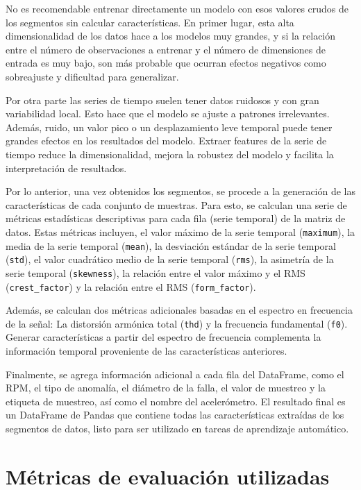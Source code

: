 \documentclass[11pt,a4paper,spanish]{book}
\numberwithin{equation}{chapter}
\numberwithin{figure}{chapter}
\begin{document}
No es recomendable entrenar directamente un modelo con esos valores crudos de los 
segmentos sin calcular características. En primer lugar, esta alta dimensionalidad de 
los datos hace a los modelos muy grandes, y si la relación entre el número de 
observaciones a entrenar y el número de dimensiones de entrada es muy bajo, son más 
probable que ocurran  efectos negativos como sobreajuste y dificultad para generalizar. 


Por otra parte las series de tiempo suelen tener datos ruidosos y con gran variabilidad 
local. Esto hace que el modelo se ajuste a patrones irrelevantes.  Además, ruido, un 
valor pico o un desplazamiento leve temporal puede tener grandes efectos en los 
resultados del modelo. Extraer features de la serie de tiempo reduce la dimensionalidad, 
mejora la robustez del modelo y facilita la interpretación de resultados. 


Por lo anterior, una vez obtenidos los segmentos, se procede a la generación de las 
características de cada conjunto de muestras. Para esto, se calculan una serie de 
métricas estadísticas descriptivas para cada fila (serie temporal) de la matriz de 
datos. Estas métricas incluyen, el valor máximo de la serie temporal (\texttt{maximum}),
la media de la serie temporal (\texttt{mean}), la desviación estándar de la serie
temporal (\texttt{std}), el valor cuadrático medio de la serie temporal (\texttt{rms}),
la asimetría de la serie temporal (\texttt{skewness}), la relación entre el valor máximo 
y el RMS (\texttt{crest\_factor}) y la relación entre el RMS (\texttt{form\_factor}).

Además, se calculan dos métricas adicionales basadas en el espectro en frecuencia de la señal:
La distorsión armónica total (\texttt{thd}) y la frecuencia fundamental (\texttt{f0}).
Generar características a partir del espectro de frecuencia complementa la información
temporal proveniente de las características anteriores. 


Finalmente, se agrega información adicional a cada fila del DataFrame, como el RPM, el 
tipo de anomalía, el diámetro de la falla, el valor de muestreo y la etiqueta de 
muestreo, así como el nombre del acelerómetro. El resultado final es un DataFrame de 
Pandas que contiene todas las características extraídas de los segmentos de datos, 
listo para ser utilizado en tareas de aprendizaje automático.



\section{Métricas de evaluación utilizadas}
\end{document}
